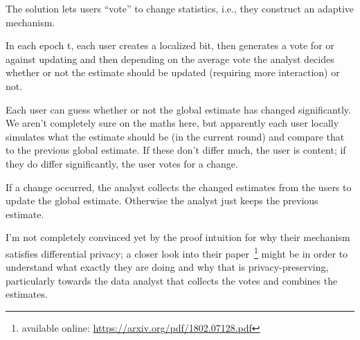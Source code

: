 \documentclass{article}
\begin{document}
The solution lets users “vote” to change statistics, i.e., they construct an adaptive mechanism.


In each epoch t, each user creates a localized bit, then generates a vote for or against updating and then depending on the average vote the analyst decides whether or not the estimate should be updated (requiring more interaction) or not.

Each user can guess whether or not the global estimate has changed significantly. We aren’t completely sure on the maths here, but apparently each user locally simulates what the estimate should be (in the current round) and compare that to the previous global estimate. If these don’t differ much, the user is content; if they do differ significantly, the user votes for a change.

If a change occurred, the analyst collects the changed estimates from the users to update the global estimate. Otherwise the analyst just keeps the previous estimate.

I’m not completely convinced yet by the proof intuition for why their mechanism satisfies differential privacy; a closer look into their paper~\footnote{available online: \url{https://arxiv.org/pdf/1802.07128.pdf}} might be in order to understand what exactly they are doing and why that is privacy-preserving, particularly towards the data analyst that collects the votes and combines the estimates.







\end{document}
